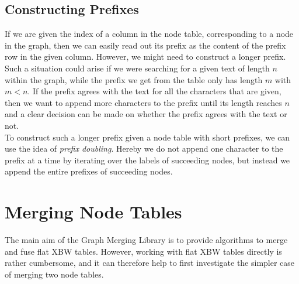\documentclass[a4paper,12pt,twoside,BCOR=10mm]{scrbook}
\begin{document}

\subsection{Constructing Prefixes}

If we are given the index of a column in the node table, corresponding to a node in the graph, 
then we can easily read out its prefix as the content of the prefix row in the given column. 
However, we might need to construct a longer prefix. 
Such a situation could arise if we were searching for a given text of length $ n $ within the 
graph, while the prefix we get from the table only has length $ m $ with $ m < n $. 
If the prefix agrees with the text for all the characters that are given, then we want to 
append more characters to the prefix until its length reaches $ n $ and a clear decision can 
be made on whether the prefix agrees with the text or not. \\
To construct such a longer prefix given a node table with short prefixes, we can use the 
idea of \textit{prefix doubling}. 
Hereby we do not append one character to the prefix at a time by iterating over the labels of succeeding nodes, 
but instead we append the entire prefixes of succeeding nodes.


% 

\section{Merging Node Tables}
%

The main aim of the Graph Merging Library is to provide algorithms 
to merge and fuse flat XBW tables. 
However, working with flat XBW tables directly is rather cumbersome, 
and it can therefore help to first investigate the simpler case 
of merging two node tables.
\end{document}
